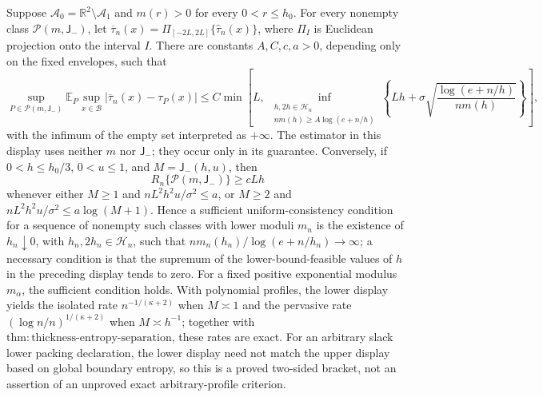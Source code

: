 Suppose \(\mathcal A_0=\mathbb R^2\setminus\mathcal A_1\) and \(m(r)>0\) for every \(0<r\le h_0\). For every nonempty class \(\mathcal P(m,\mathsf J_{-})\), let \(\overline\tau_n(x)=\Pi_{[-2L,2L]}\{\widehat\tau_n(x)\}\), where \(\Pi_I\) is Euclidean projection onto the interval \(I\). There are constants \(A,C,c,a>0\), depending only on the fixed envelopes, such that
\[
 \sup_{P\in\mathcal P(m,\mathsf J_{-})}
 \mathbb E_P\sup_{x\in\mathcal B}|\overline\tau_n(x)-\tau_P(x)|
 \le C\min\left[ L,\ 
 \inf_{\substack{h,2h\in\mathcal H_n\\nm(h)\ge A\log(e+n/h)}}
 \left\{Lh+\sigma\sqrt{\frac{\log(e+n/h)}{nm(h)}}\right\}\right],
\]
with the infimum of the empty set interpreted as \(+\infty\). The estimator in this display uses neither \(m\) nor \(\mathsf J_{-}\); they occur only in its guarantee. Conversely, if \(0<h\le h_0/3\), \(0<u\le1\), and \(M=\mathsf J_{-}(h,u)\), then
\[
 R_n\{\mathcal P(m,\mathsf J_{-})\}\ge cLh
\]
whenever either \(M\ge1\) and \(nL^2h^2u/\sigma^2\le a\), or \(M\ge2\) and \(nL^2h^2u/\sigma^2\le a\log(M+1)\). Hence a sufficient uniform-consistency condition for a sequence of nonempty such classes with lower moduli \(m_n\) is the existence of \(h_n\downarrow0\), with \(h_n,2h_n\in\mathcal H_n\), such that \(nm_n(h_n)/\log(e+n/h_n)\to\infty\); a necessary condition is that the supremum of the lower-bound-feasible values of \(h\) in the preceding display tends to zero. For a fixed positive exponential modulus \(m_\alpha\), the sufficient condition holds. With polynomial profiles, the lower display yields the isolated rate \(n^{-1/(\kappa+2)}\) when \(M\asymp1\) and the pervasive rate \((\log n/n)^{1/(\kappa+2)}\) when \(M\asymp h^{-1}\); together with \(\mathrm{thm:thickness\text{-}entropy\text{-}separation}\), these rates are exact. For an arbitrary slack lower packing declaration, the lower display need not match the upper display based on global boundary entropy, so this is a proved two-sided bracket, not an assertion of an unproved exact arbitrary-profile criterion.